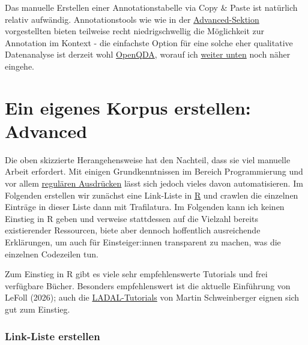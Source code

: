 \documentclass[
  letterpaper,
  DIV=11,
  numbers=noendperiod]{scrreprt}
\begin{document}
Das manuelle Erstellen einer Annotationstabelle via Copy \& Paste ist
natürlich relativ aufwändig. Annotationstools wie wie in der
\hyperref[advanced]{Advanced-Sektion} vorgestellten bieten teilweise
recht niedrigschwellig die Möglichkeit zur Annotation im Kontext - die
einfachste Option für eine solche eher qualitative Datenanalyse ist
derzeit wohl \href{https://openqda.org/}{OpenQDA}, worauf ich
\hyperref[openqda]{weiter unten} noch näher eingehe.


\chapter{Ein eigenes Korpus erstellen: Advanced}\label{advanced}

Die oben skizzierte Herangehensweise hat den Nachteil, dass sie viel
manuelle Arbeit erfordert. Mit einigen Grundkenntnissen im Bereich
Programmierung und vor allem
\href{https://www.regular-expressions.info/}{regulären Ausdrücken} lässt
sich jedoch vieles davon automatisieren. Im Folgenden erstellen wir
zunächst eine Link-Liste in \href{https://r-project.org/}{R} und crawlen
die einzelnen Einträge in dieser Liste dann mit Trafilatura. Im
Folgenden kann ich keinen Einstieg in R geben und verweise stattdessen
auf die Vielzahl bereits existierender Ressourcen, biete aber dennoch
hoffentlich ausreichende Erklärungen, um auch für Einsteiger:innen
transparent zu machen, was die einzelnen Codezeilen tun.

\begin{tcolorbox}[enhanced jigsaw, opacityback=0, colbacktitle=quarto-callout-tip-color!10!white, colframe=quarto-callout-tip-color-frame, left=2mm, rightrule=.15mm, title=\textcolor{quarto-callout-tip-color}{\faLightbulb}\hspace{0.5em}{Tip}, toptitle=1mm, titlerule=0mm, bottomtitle=1mm, toprule=.15mm, bottomrule=.15mm, arc=.35mm, breakable, coltitle=black, leftrule=.75mm, opacitybacktitle=0.6, colback=white]

Zum Einstieg in R gibt es viele sehr empfehlenswerte Tutorials und frei
verfügbare Bücher. Besonders empfehlenswert ist die aktuelle Einführung
von LeFoll (2026); auch die
\href{https://ladal.edu.au/}{LADAL-Tutorials} von Martin Schweinberger
eignen sich gut zum Einstieg.

\end{tcolorbox}

\subsection{Link-Liste erstellen}\label{link-liste-erstellen}
\end{document}
